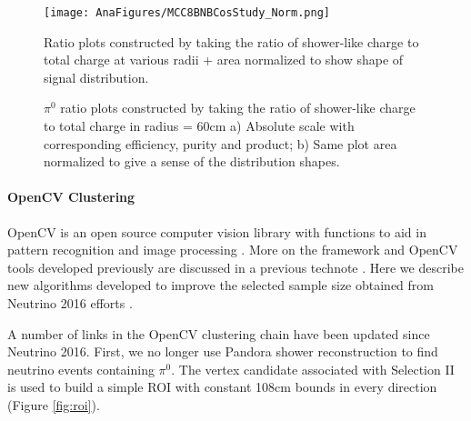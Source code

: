 \documentclass[12pt]{article}
\begin{document}
\clearpage

\begin{figure}[h!]
\texttt{[image: AnaFigures/MCC8BNBCosStudy\_Norm.png]}
\caption{Ratio plots constructed by taking the ratio of shower-like charge to total charge at various radii + area normalized to show shape of signal distribution. }
\label{fig:all_radii_norm}
\end{figure}

\clearpage
\begin{figure}[H]
\centering
{}
\hspace{1 mm}
\caption{$\pi^0$ ratio plots constructed by taking the ratio of shower-like charge to total charge in radius = 60cm a) Absolute scale with corresponding efficiency, purity and product; b) Same plot area normalized to give a sense of the distribution shapes. }
\label{fig:separation}
\end{figure}


\paragraph{OpenCV Clustering}
OpenCV is an open source computer vision library with functions to aid in pattern recognition and image processing \cite{bib:opencv}. More on the framework and OpenCV tools developed previously are discussed in a previous technote \cite{bib:5856}. Here we describe new algorithms developed to improve the selected sample size obtained from Neutrino 2016 efforts \cite{bib:5864}.
\par A number of links in the OpenCV clustering chain have been updated since Neutrino 2016. First, we no longer use Pandora shower reconstruction to find neutrino events containing $\pi^0$. The vertex candidate associated with Selection II is used to build a simple ROI with constant 108cm bounds in every direction (Figure \ref{fig:roi}). 
\end{document}
